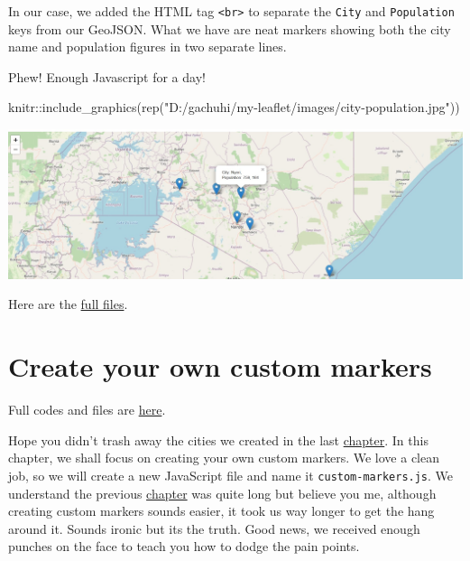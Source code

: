 \documentclass[
]{book}
\newenvironment{Shaded}{\begin{snugshade}}{\end{snugshade}}
\newcommand{\FunctionTok}[1]{\textcolor[rgb]{0.00,0.00,0.00}{#1}}
\newcommand{\NormalTok}[1]{#1}
\newcommand{\SpecialCharTok}[1]{\textcolor[rgb]{0.00,0.00,0.00}{#1}}
\newcommand{\StringTok}[1]{\textcolor[rgb]{0.31,0.60,0.02}{#1}}
\begin{document}
In our case, we added the HTML tag \texttt{\textless{}br\textgreater{}} to separate the \texttt{City} and \texttt{Population} keys from our GeoJSON. What we have are neat markers showing both the city name and population figures in two separate lines.

Phew! Enough Javascript for a day!

\begin{Shaded}
\begin{Highlighting}[]
\NormalTok{knitr}\SpecialCharTok{::}\FunctionTok{include\_graphics}\NormalTok{(}\FunctionTok{rep}\NormalTok{(}\StringTok{"D:/gachuhi/my{-}leaflet/images/city{-}population.jpg"}\NormalTok{))}
\end{Highlighting}
\end{Shaded}

\includegraphics[width=25.78in]{../images/city-population}

Here are the \href{https://www.dropbox.com/scl/fo/uj45qo0gmed5xudmw1xja/h?dl=0\&rlkey=09mhhfdualbs92f7wg5atgdrx}{full files}.

\hypertarget{create-your-own-custom-markers}{%
\chapter{Create your own custom markers}\label{create-your-own-custom-markers}}

Full codes and files are \href{https://www.dropbox.com/scl/fo/ecidt41insvnzpwvmj9iw/h?dl=0\&rlkey=yy4w9p76osxs913p19wvnsjez}{here}.

Hope you didn't trash away the cities we created in the last \protect\hyperlink{using-geojson-in-leaflet}{chapter}. In this chapter, we shall focus on creating your own custom markers. We love a clean job, so we will create a new JavaScript file and name it \texttt{custom-markers.js}. We understand the previous \protect\hyperlink{using-geojson-in-leaflet}{chapter} was quite long but believe you me, although creating custom markers sounds easier, it took us way longer to get the hang around it. Sounds ironic but its the truth. Good news, we received enough punches on the face to teach you how to dodge the pain points.
\end{document}
